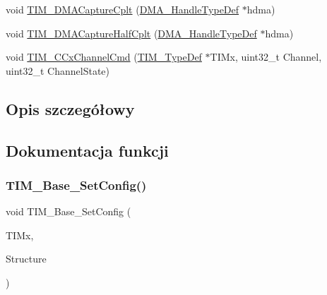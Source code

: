 \begin{DoxyCompactItemize}
\item 
void \hyperlink{group___t_i_m___private___functions_ga60b9c315720fddb3db32299f05f7d712}{T\+I\+M\+\_\+\+D\+M\+A\+Capture\+Cplt} (\hyperlink{group___d_m_a___exported___types_ga41b754a906b86bce54dc79938970138b}{D\+M\+A\+\_\+\+Handle\+Type\+Def} $\ast$hdma)
\item 
void \hyperlink{group___t_i_m___private___functions_ga2c2f2f092eaa9414661422f06fdc56a0}{T\+I\+M\+\_\+\+D\+M\+A\+Capture\+Half\+Cplt} (\hyperlink{group___d_m_a___exported___types_ga41b754a906b86bce54dc79938970138b}{D\+M\+A\+\_\+\+Handle\+Type\+Def} $\ast$hdma)
\item 
void \hyperlink{group___t_i_m___private___functions_ga7fcc6d5ca311c37f5d0250687c899924}{T\+I\+M\+\_\+\+C\+Cx\+Channel\+Cmd} (\hyperlink{struct_t_i_m___type_def}{T\+I\+M\+\_\+\+Type\+Def} $\ast$T\+I\+Mx, uint32\+\_\+t Channel, uint32\+\_\+t Channel\+State)
\end{DoxyCompactItemize}


\subsection{Opis szczegółowy}


\subsection{Dokumentacja funkcji}
\mbox{\label{group___t_i_m___private___functions_ga057e4b4da135186e8fb88327c5fd0684}} 
\subsubsection{\texorpdfstring{T\+I\+M\+\_\+\+Base\+\_\+\+Set\+Config()}{TIM\_Base\_SetConfig()}}
{\footnotesize\ttfamily void T\+I\+M\+\_\+\+Base\+\_\+\+Set\+Config (\begin{DoxyParamCaption}\item[{\hyperlink{struct_t_i_m___type_def}{T\+I\+M\+\_\+\+Type\+Def} $\ast$}]{T\+I\+Mx,  }\item[{\hyperlink{struct_t_i_m___base___init_type_def}{T\+I\+M\+\_\+\+Base\+\_\+\+Init\+Type\+Def} $\ast$}]{Structure }\end{DoxyParamCaption})}

